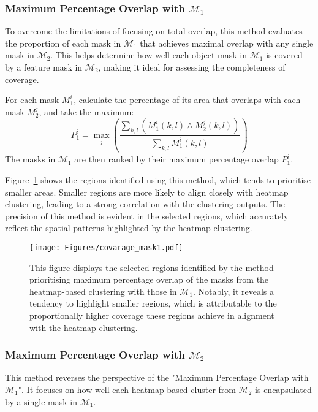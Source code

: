 \subsubsection{Maximum Percentage Overlap with $\mathcal{M}_1$} 
To overcome the limitations of focusing on total overlap, this method evaluates the proportion of each mask in \(\mathcal{M}_1\) that achieves maximal overlap with any single mask in \(\mathcal{M}_2\). This helps determine how well each object mask in \(\mathcal{M}_1\) is covered by a feature mask in \(\mathcal{M}_2\), making it ideal for assessing the completeness of coverage.

For each mask \( M_1^i \), calculate the percentage of its area that overlaps with each mask \( M_2^j \), and take the maximum:
\begin{equation*}
    P_1^i = \max_j \left( \frac{\sum_{k, l} \left( M_1^i(k, l) \land M_2^j(k, l) \right)}{\sum_{k, l} M_1^i(k, l)} \right)
\end{equation*}
The masks in \(\mathcal{M}_1\) are then ranked by their maximum percentage overlap \( P_1^i \).

Figure~\ref{Fig:covarage_mask1} shows the regions identified using this method, which tends to prioritise smaller areas. Smaller regions are more likely to align closely with heatmap clustering, leading to a strong correlation with the clustering outputs. The precision of this method is evident in the selected regions, which accurately reflect the spatial patterns highlighted by the heatmap clustering.

\begin{figure}[ht!]
\begin{center}
\texttt{[image: Figures/covarage\_mask1.pdf]}
\end{center}
\caption{This figure displays the selected regions identified by the method prioritising maximum percentage overlap of the masks from the heatmap-based clustering with those in $\mathcal{M}_1$. Notably, it reveals a tendency to highlight smaller regions, which is attributable to the proportionally higher coverage these regions achieve in alignment with the heatmap clustering.}
\label{Fig:covarage_mask1}
\end{figure} 

\subsubsection{Maximum Percentage Overlap with $\mathcal{M}_2$} 

This method reverses the perspective of the "Maximum Percentage Overlap with \(\mathcal{M}_1\)". It focuses on how well each heatmap-based cluster from \(\mathcal{M}_2\) is encapsulated by a single mask in \(\mathcal{M}_1\).

